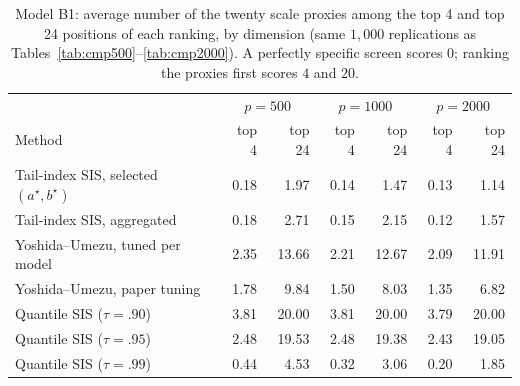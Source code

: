 \begin{table}[t]
\centering
\caption{Model B1: average number of the twenty scale proxies among the top 4 and top 24 positions of each ranking, by dimension (same $1{,}000$ replications as Tables~\ref{tab:cmp500}--\ref{tab:cmp2000}). A perfectly specific screen scores $0$; ranking the proxies first scores $4$ and $20$.}
\label{tab:b1comp}
\begin{tabular}{lrrrrrr}
\toprule
 & \multicolumn{2}{c}{$p=500$} & \multicolumn{2}{c}{$p=1000$}
 & \multicolumn{2}{c}{$p=2000$}\\
Method & top 4 & top 24 & top 4 & top 24 & top 4 & top 24\\
\midrule
Tail-index SIS, selected $(a^\star,b^\star)$ & 0.18 & 1.97 & 0.14 & 1.47 & 0.13 & 1.14\\
Tail-index SIS, aggregated & 0.18 & 2.71 & 0.15 & 2.15 & 0.12 & 1.57\\
Yoshida--Umezu, tuned per model & 2.35 & 13.66 & 2.21 & 12.67 & 2.09 & 11.91\\
Yoshida--Umezu, paper tuning & 1.78 & 9.84 & 1.50 & 8.03 & 1.35 & 6.82\\
Quantile SIS ($\tau=.90$) & 3.81 & 20.00 & 3.81 & 20.00 & 3.79 & 20.00\\
Quantile SIS ($\tau=.95$) & 2.48 & 19.53 & 2.48 & 19.38 & 2.43 & 19.05\\
Quantile SIS ($\tau=.99$) & 0.44 & 4.53 & 0.32 & 3.06 & 0.20 & 1.85\\
\bottomrule
\end{tabular}
\end{table}
